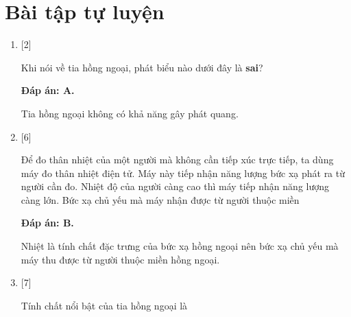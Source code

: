 \section{Bài tập tự luyện}
\begin{enumerate}[label=\bfseries Câu \arabic*:]
	
	\item {} [2]
	\cauhoi
	{Khi nói về tia hồng ngoại, phát biểu nào dưới đây là \textbf{sai}?
	}
	
	\loigiai
	{		\textbf{Đáp án: A.}
		
		Tia hồng ngoại không có khả năng gây phát quang.
	}
	
	\item {} [6]
	\cauhoi
	{Để đo thân nhiệt của một người mà không cần tiếp xúc trực tiếp, ta dùng máy đo thân nhiệt điện tử. Máy này tiếp nhận năng lượng bức xạ phát ra từ người cần đo. Nhiệt độ của người càng cao thì máy tiếp nhận năng lượng càng lớn. Bức xạ chủ yếu mà máy nhận được từ người thuộc miền 
	}
	
	\loigiai
	{		\textbf{Đáp án: B.}
		
		Nhiệt là tính chất đặc trưng của bức xạ hồng ngoại nên bức xạ chủ yếu mà máy thu được từ người thuộc miền hồng ngoại.
	}
	
	\item {} [7]
	\cauhoi
	{Tính chất nổi bật của tia hồng ngoại là
	}
	

\end{enumerate}
